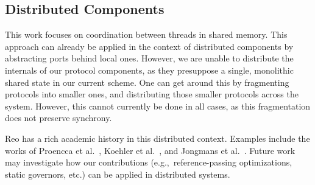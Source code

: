 \subsection{Distributed Components}
This work focuses on coordination between threads in shared memory. This approach can already be applied in the context of distributed components by abstracting ports behind local ones. However, we are unable to distribute the internals of our protocol components, as they presuppose a single, monolithic shared state in our current scheme. One can get around this by fragmenting protocols into smaller ones, and distributing those smaller protocols across the system. However, this cannot currently be done in all cases, as this fragmentation does not preserve synchrony. 

Reo has a rich academic history in this distributed context. Examples include the works of Proencca et al.~\cite{proencca2012dreams}, Koehler et al.~\cite{koehler2008reconfiguring}, and Jongmans et al.~\cite{jongmans2014partially}. Future work may investigate how our contributions (e.g.,\ reference-passing optimizations, static governors, etc.) can be applied in distributed systems.



